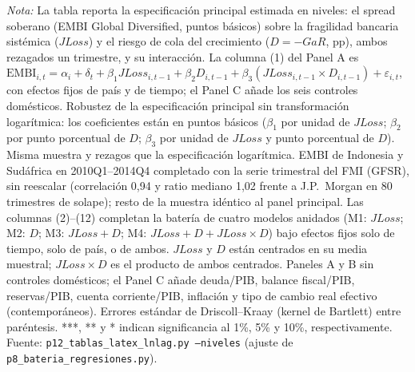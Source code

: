 \documentclass[11pt]{article}
\begin{document}
\begin{landscape}
\begin{table}
\par\smallskip\parbox{\linewidth}{\scriptsize \textit{Nota:} La tabla reporta la especificación principal estimada en niveles: el spread soberano (EMBI Global Diversified, puntos básicos) sobre la fragilidad bancaria sistémica ($JLoss$) y el riesgo de cola del crecimiento ($D=-GaR$, pp), ambos rezagados un trimestre, y su interacción. La columna (1) del Panel A es $\mathrm{EMBI}_{i,t}=\alpha_i+\delta_t+\beta_1 JLoss_{i,t-1}+\beta_2 D_{i,t-1}+\beta_3(JLoss_{i,t-1}\times D_{i,t-1})+\varepsilon_{i,t}$, con efectos fijos de país y de tiempo; el Panel C añade los seis controles domésticos. Robustez de la especificación principal sin transformación logarítmica: los coeficientes están en puntos básicos ($\beta_1$ por unidad de $JLoss$; $\beta_2$ por punto porcentual de $D$; $\beta_3$ por unidad de $JLoss$ y punto porcentual de $D$). Misma muestra y rezagos que la especificación logarítmica. EMBI de Indonesia y Sudáfrica en 2010Q1--2014Q4 completado con la serie trimestral del FMI (GFSR), sin reescalar (correlación 0,94 y ratio mediano 1,02 frente a J.P.\ Morgan en 80 trimestres de solape); resto de la muestra idéntico al panel principal. Las columnas (2)--(12) completan la batería de cuatro modelos anidados (M1: $JLoss$; M2: $D$; M3: $JLoss+D$; M4: $JLoss+D+JLoss\times D$) bajo efectos fijos solo de tiempo, solo de país, o de ambos. $JLoss$ y $D$ están centrados en su media muestral; $JLoss\times D$ es el producto de ambos centrados. Paneles A y B sin controles domésticos; el Panel C añade deuda/PIB, balance fiscal/PIB, reservas/PIB, cuenta corriente/PIB, inflación y tipo de cambio real efectivo (contemporáneos). Errores estándar de Driscoll--Kraay (kernel de Bartlett) entre paréntesis. ***, ** y * indican significancia al 1\%, 5\% y 10\%, respectivamente. Fuente: \texttt{p12\_tablas\_latex\_lnlag.py --niveles} (ajuste de \texttt{p8\_bateria\_regresiones.py}).}
\end{table}
\end{landscape}

\clearpage
\end{document}
